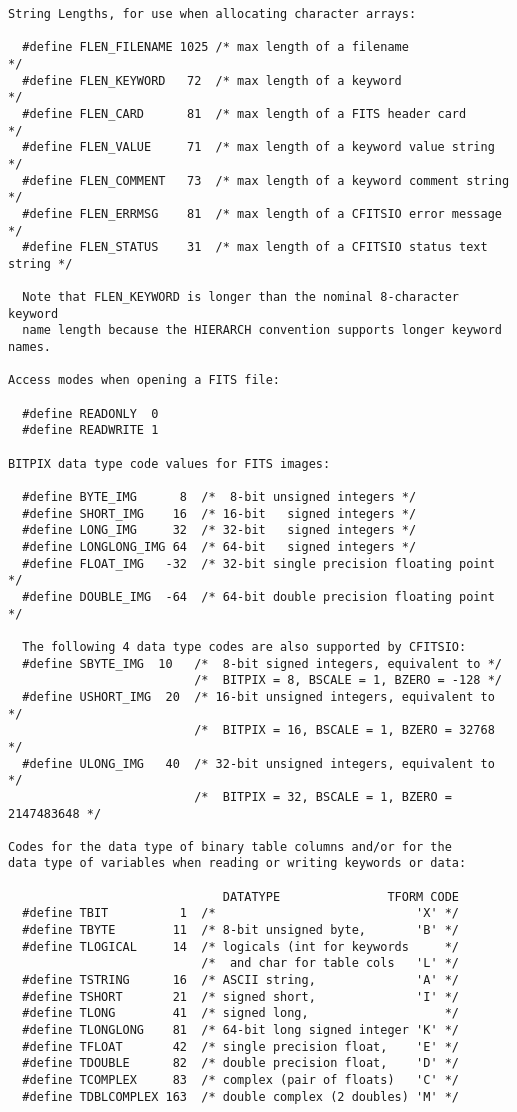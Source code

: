 \documentclass[11pt]{book}
\begin{document}
\begin{verbatim}
String Lengths, for use when allocating character arrays:

  #define FLEN_FILENAME 1025 /* max length of a filename                  */
  #define FLEN_KEYWORD   72  /* max length of a keyword                   */
  #define FLEN_CARD      81  /* max length of a FITS header card          */
  #define FLEN_VALUE     71  /* max length of a keyword value string      */
  #define FLEN_COMMENT   73  /* max length of a keyword comment string    */
  #define FLEN_ERRMSG    81  /* max length of a CFITSIO error message     */
  #define FLEN_STATUS    31  /* max length of a CFITSIO status text string */

  Note that FLEN_KEYWORD is longer than the nominal 8-character keyword
  name length because the HIERARCH convention supports longer keyword names.

Access modes when opening a FITS file:

  #define READONLY  0
  #define READWRITE 1

BITPIX data type code values for FITS images:

  #define BYTE_IMG      8  /*  8-bit unsigned integers */
  #define SHORT_IMG    16  /* 16-bit   signed integers */
  #define LONG_IMG     32  /* 32-bit   signed integers */
  #define LONGLONG_IMG 64  /* 64-bit   signed integers */
  #define FLOAT_IMG   -32  /* 32-bit single precision floating point */
  #define DOUBLE_IMG  -64  /* 64-bit double precision floating point */

  The following 4 data type codes are also supported by CFITSIO:
  #define SBYTE_IMG  10   /*  8-bit signed integers, equivalent to */
                          /*  BITPIX = 8, BSCALE = 1, BZERO = -128 */
  #define USHORT_IMG  20  /* 16-bit unsigned integers, equivalent to */
                          /*  BITPIX = 16, BSCALE = 1, BZERO = 32768 */
  #define ULONG_IMG   40  /* 32-bit unsigned integers, equivalent to */
                          /*  BITPIX = 32, BSCALE = 1, BZERO = 2147483648 */

Codes for the data type of binary table columns and/or for the
data type of variables when reading or writing keywords or data:

                              DATATYPE               TFORM CODE
  #define TBIT          1  /*                            'X' */
  #define TBYTE        11  /* 8-bit unsigned byte,       'B' */
  #define TLOGICAL     14  /* logicals (int for keywords     */
                           /*  and char for table cols   'L' */
  #define TSTRING      16  /* ASCII string,              'A' */
  #define TSHORT       21  /* signed short,              'I' */
  #define TLONG        41  /* signed long,                   */
  #define TLONGLONG    81  /* 64-bit long signed integer 'K' */
  #define TFLOAT       42  /* single precision float,    'E' */
  #define TDOUBLE      82  /* double precision float,    'D' */
  #define TCOMPLEX     83  /* complex (pair of floats)   'C' */
  #define TDBLCOMPLEX 163  /* double complex (2 doubles) 'M' */


\end{verbatim}
\end{document}
